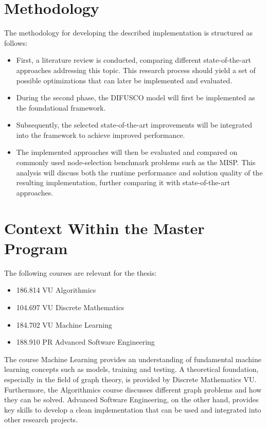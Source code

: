 \documentclass[11pt,a4paper]{article}
\begin{document}
\section{Methodology}
The methodology for developing the described implementation is structured as follows:
\begin{itemize}
    \item First, a literature review is conducted, comparing different state-of-the-art approaches addressing this topic. This research process should yield a set of possible optimizations that can later be implemented and evaluated.
    \item During the second phase, the DIFUSCO model will first be implemented as the foundational framework.
    \item Subsequently, the selected state-of-the-art improvements will be integrated into the framework to achieve improved performance.
    \item The implemented approaches will then be evaluated and compared on commonly used node-selection benchmark problems such as the MISP. This analysis will discuss both the runtime performance and solution quality of the resulting implementation, further comparing it with state-of-the-art approaches.
\end{itemize}

\section{Context Within the Master Program}
The following courses are relevant for the thesis:
\begin{itemize}
    \item 186.814 VU Algorithmics 
    \item 104.697 VU Discrete Mathematics
    \item 184.702 VU Machine Learning
    \item 188.910 PR Advanced Software Engineering
\end{itemize}

The course Machine Learning provides an understanding of fundamental machine learning concepts such as models, training and testing. A theoretical foundation, especially in the field of graph theory, is provided by Discrete Mathematics VU. Furthermore, the Algorithmics course discusses different graph problems and how they can be solved. Advanced Software Engineering, on the other hand, provides key skills to develop a clean implementation that can be used and integrated into other research projects.

\newpage



\end{document}

